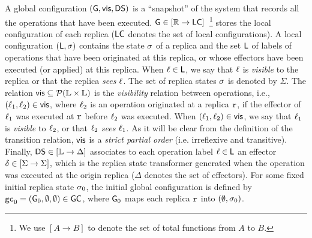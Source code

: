 A global configuration $(\mathsf{G}, \mathsf{vis}, \mathsf{DS})$ is a
``snapshot'' of the system that records all the operations that have
been executed.
$\mathsf{G} \in [\mathbb{R} \rightarrow \mathsf{LC}]$~\footnote{We use $[A\rightarrow B]$ to denote the set of total functions from
  $A$ to $B$.} stores the local
configuration of each replica ($\mathsf{LC}$ denotes the set of local configurations).
A local configuration $(\mathsf{L}, \sigma)$ contains the state
$\sigma$ of a replica and the set $\mathsf{L}$ of labels of
operations that have been originated at this replica, or whose
effectors have been executed (or applied) at this replica.
When $\ell\in \mathsf{L}$, we say that $\ell$ is \emph{visible}
to the replica or that the replica \emph{sees} $\ell$.
The set of replica states $\sigma$ is denoted by $\Sigma$.
The relation $\mathsf{vis}\subseteq \mathcal{P}(\mathbb{L} \times \mathbb{L})$ is
the \emph{visibility} relation between operations, i.e.,
$(\ell_1,\ell_2)\in \mathsf{vis}$, where $\ell_2$ is an operation
originated at a replica $\mathtt{r}$, if the effector of $\ell_1$ was
executed at $\mathtt{r}$ before $\ell_2$ was executed.
When $(\ell_1,\ell_2)\in \mathsf{vis}$, we say that $\ell_1$ is
\emph{visible} to $\ell_2$, or that $\ell_2$ \emph{sees}
$\ell_1$.
As it will be clear from the definition of the transition relation,
$\mathsf{vis}$ is a \emph{strict partial order} (i.e.
irreflexive and transitive).
Finally, $\mathsf{DS}\in [\mathbb{L} \rightarrow \Delta]$ associates to
each operation label $\ell \in \mathsf{L}$ an effector
$\delta\in [\Sigma \rightarrow \Sigma]$, which is the replica
state transformer generated when the operation was executed at the
origin replica ($\Delta$ denotes the set of effectors).
%
For some fixed initial replica state $\sigma_0$, the initial global configuration is defined by $\mathtt{gc}_0 = (\mathsf{G}_0, \emptyset, \emptyset) \in \mathsf{GC}$, where $\mathsf{G}_0$ maps each replica $\mathtt{r}$ into $(\emptyset, \sigma_0)$.


